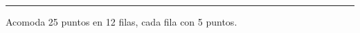 \bigskip\hrule\bigskip

\par
\begin{minipage}[t]{0.48\textwidth}
    \noindent
    \begin{excercise}
        Acomoda 25 puntos en 12 filas, cada fila con 5 puntos.
    \end{excercise}
\end{minipage}
\begin{minipage}[t]{0.48\textwidth}
    \noindent
    \begin{center}
    \end{center}
\end{minipage}